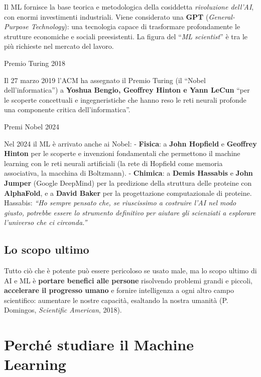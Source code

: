 Il ML fornisce la base teorica e metodologica della cosiddetta
\emph{rivoluzione dell'AI}, con enormi investimenti industriali. Viene
considerato una \textbf{GPT} (\emph{General-Purpose Technology}): una
tecnologia capace di trasformare profondamente le strutture economiche e
sociali preesistenti. La figura del ``\emph{ML scientist}'' è tra le più
richieste nel mercato del lavoro.

\begin{boxnote}{Premio Turing 2018}

Il 27 marzo 2019 l'ACM ha assegnato il Premio Turing (il ``Nobel
dell'informatica'') a \textbf{Yoshua Bengio, Geoffrey Hinton e Yann
LeCun} ``per le scoperte concettuali e ingegneristiche che hanno reso le
reti neurali profonde una componente critica dell'informatica''.

\end{boxnote}

\begin{boxnote}{Premi Nobel 2024}

Nel 2024 il ML è arrivato anche ai Nobel: - \textbf{Fisica}: a
\textbf{John Hopfield} e \textbf{Geoffrey Hinton} per le scoperte e
invenzioni fondamentali che permettono il machine learning con le reti
neurali artificiali (la rete di Hopfield come memoria associativa, la
macchina di Boltzmann). - \textbf{Chimica}: a \textbf{Demis Hassabis} e
\textbf{John Jumper} (Google DeepMind) per la predizione della struttura
delle proteine con \textbf{AlphaFold}, e a \textbf{David Baker} per la
progettazione computazionale di proteine. Hassabis: \emph{``Ho sempre
pensato che, se riuscissimo a costruire l'AI nel modo giusto, potrebbe
essere lo strumento definitivo per aiutare gli scienziati a esplorare
l'universo che ci circonda.''}

\end{boxnote}

\subsection{Lo scopo ultimo}\label{lo-scopo-ultimo}

Tutto ciò che è potente può essere pericoloso se usato male, ma lo scopo
ultimo di AI e ML è \textbf{portare benefici alle persone} risolvendo
problemi grandi e piccoli, \textbf{accelerare il progresso umano} e
fornire intelligenza a ogni altro campo scientifico: aumentare le nostre
capacità, esaltando la nostra umanità (P. Domingos, \emph{Scientific
American}, 2018).

\section{Perché studiare il Machine
Learning}\label{perchuxe9-studiare-il-machine-learning}

